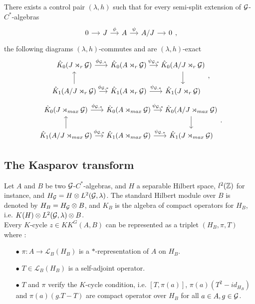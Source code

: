 \begin{prop}
There exists a control pair $(\lambda,h)$ such that for every semi-split extension of $\mathcal G$-$C^*$-algebras
\[\begin{tikzcd}[column sep = small]
0 \arrow{r} & J\arrow{r}{\phi}& A \arrow{r}{\psi} & A/J \arrow{r} & 0
\end{tikzcd},\]
the following diagrams $(\lambda,h)$-commutes and are $(\lambda,h)$-exact 
\[\begin{tikzcd}[column sep = small]
\hat K_0(J\rtimes_r \G) \arrow{r}{\phi_{\G,*}}&\hat K_0( A\rtimes_r \G ) \arrow{r}{\psi_{\G,*}} & \hat K_0( A/J\rtimes_r \G) \arrow{d} \\
\hat K_1(A/J\rtimes_r \G) \arrow{u} \arrow{r}{\phi_{\G,*}}& \hat K_1( A\rtimes_r \G ) \arrow{r}{\psi_{\G,*}} & \hat K_1( J\rtimes_r \G)
\end{tikzcd},\]
\[\begin{tikzcd}[column sep = small]
\hat K_0(J\rtimes_{max} \G) \arrow{r}{\phi_{\G,*}}&\hat K_0( A\rtimes_{max} \G ) \arrow{r}{\psi_{\G,*}} & \hat K_0( A/J\rtimes_{max} \G) \arrow{d} \\
\hat K_1(A/J\rtimes_{max} \G) \arrow{u} \arrow{r}{\phi_{\G,*}}& \hat K_1( A\rtimes_{max} \G ) \arrow{r}{\psi_{\G,*}} & \hat K_1( J\rtimes_{max} \G)
\end{tikzcd}.\]
\end{prop}

\subsection{The Kasparov transform}

Let $A$ and $B$ be two $\mathcal G$-$C^*$-algebras, and $H$ a separable Hilbert space, $l^2(\mathbb Z)$ for instance, and $H_\mathcal G= H\otimes L^2(\mathcal G,\lambda)$. The standard Hilbert module over $B$ is denoted by $H_B=H_\mathcal G\otimes B$, and $K_B$ is the algebra of compact operators for $H_B$, i.e. $K(H)\otimes L^2(\mathcal G,\lambda)\otimes B$. \\

Every $K$-cycle $z\in KK^G(A,B)$ can be represented as a triplet $(H_B, \pi, T)$ where :
\begin{itemize}
\item[$\bullet$]$\pi : A\rightarrow \mathcal L_B(H_B)$ is a $*$-representation of $A$ on $H_B$.
\item[$\bullet$]$T\in \mathcal L_B(H_B)$ is a self-adjoint operator.
\item[$\bullet$] $T$ and $\pi$ verify the $K$-cycle condition, i.e. $[T,\pi(a)]$, $\pi(a)(T^2-id_{H_B})$ and $\pi(a)(g.T-T)$ are compact operator over $H_B$ for all $a\in A, g\in \mathcal G$.\\
\end{itemize}

